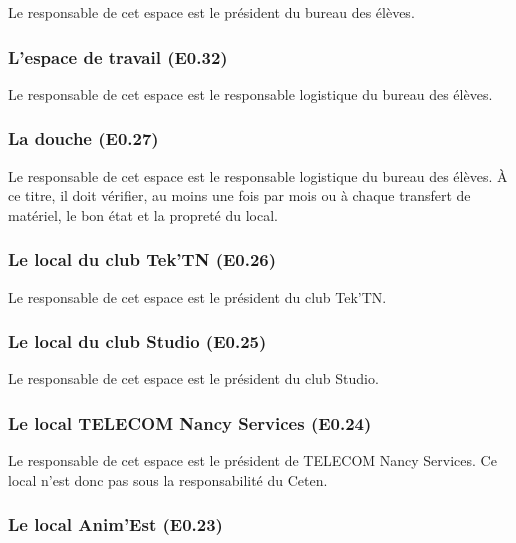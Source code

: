 \documentclass{article} %
\begin{document}
				Le responsable de cet espace est le président du bureau des
				élèves.

			\subsubsection{L'espace de travail (E0.32)}
\label{ssub:l_espace_de_travail_e0_32_}

			Le responsable de cet espace est le responsable logistique du
			bureau des élèves.

			\subsubsection{La douche (E0.27)}
\label{ssub:la_douche_e0_27_}

				Le responsable de cet espace est le responsable logistique du
				bureau des élèves. À ce titre, il doit vérifier, au moins une
				fois par mois ou à chaque transfert de matériel, le bon état et
				la propreté du local.

			\subsubsection{Le local du club Tek'TN (E0.26)}
\label{ssub:le_local_du_club_tek_tn_e0_26_}

				Le responsable de cet espace est le président du club Tek’TN\@.

			\subsubsection{Le local du club Studio (E0.25)}
\label{ssub:le_local_du_club_studio_e0_25_}

				Le responsable de cet espace est le président du club Studio. 

			\subsubsection{Le local TELECOM Nancy Services (E0.24)}
\label{ssub:le_local_telecom_nancy_services_e0_24_}

				Le responsable de cet espace est le président de TELECOM Nancy
				Services. Ce local n’est donc pas sous la responsabilité du
				Ceten.

			\subsubsection{Le local Anim'Est (E0.23)}
\label{ssub:le_local_anim_est_e0_23_}
\end{document}

